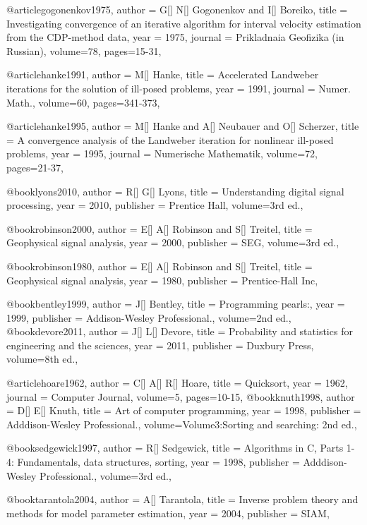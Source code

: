 @article{gogonenkov1975,
  author =	 {G[] N[] Gogonenkov and I[] Boreiko},
  title =	 {Investigating convergence of an iterative algorithm for interval velocity estimation from the CDP-method data},
  year =	 1975,
  journal =	 {Prikladnaia Geofizika (in Russian)},
  volume={78},
 pages=15-31,
}


@article{hanke1991,
  author =	 {M[] Hanke},
  title =	 {Accelerated Landweber iterations for the solution of ill-posed problems},
  year =	 1991,
  journal =	 {Numer. Math.},
  volume={60},
 pages=341-373,
}


@article{hanke1995,
  author =	 {M[] Hanke and A[] Neubauer and O[] Scherzer},
  title =	 {A convergence analysis of the Landweber iteration for nonlinear ill-posed problems},
  year =	 1995,
  journal =	 {Numerische Mathematik},
  volume={72},
 pages=21-37,
}

@book{lyons2010,
  author =	 {R[] G[] Lyons},
  title =	 {Understanding digital signal processing},
  year =	 2010,
  publisher =	 {Prentice Hall},
  volume={3rd ed.},
}

@book{robinson2000,
  author =	 {E[] A[] Robinson and S[] Treitel},
  title =	 {Geophysical signal analysis},
  year =	 2000,
  publisher =	 {SEG},
  volume={3rd ed.},
}

@book{robinson1980,
  author =	 {E[] A[] Robinson and S[] Treitel},
  title =	 {Geophysical signal analysis},
  year =	 1980,
  publisher =	 {Prentice-Hall Inc},
}

@book{bentley1999,
  author =	 {J[] Bentley},
  title =	 {Programming pearls:},
  year =	 1999,
  publisher =	 {Addison-Wesley Professional.},
  volume={2nd ed.},
}
@book{devore2011,
  author =	 {J[] L[] Devore},
  title =	 {Probability and statistics for engineering and the sciences},
  year =	 2011,
  publisher =	 {Duxbury Press},
  volume={8th ed.},
}

@article{hoare1962,
  author =	 {C[] A[] R[] Hoare},
  title =	 {Quicksort},
  year =	 1962,
  journal =	 {Computer Journal},
  volume={5},
 pages=10-15,
}
@book{knuth1998,
  author =	 {D[] E[] Knuth},
  title =	 {Art of computer programming},
  year =	 1998,
  publisher =	 { Adddison-Wesley Professional.},
  volume={Volume3:Sorting and searching: 2nd ed.},
}

@book{sedgewick1997,
  author =	 {R[] Sedgewick},
  title =	 {Algorithms in C, Parts 1-4: Fundamentals, data structures, sorting},
  year =	 1998,
  publisher =	 { Adddison-Wesley Professional.},
  volume={3rd ed.},
}

@book{tarantola2004,
  author =	 {A[] Tarantola},
  title =	 {Inverse problem theory and methods for model parameter estimation},
  year =	 2004,
  publisher =	 { SIAM},
}

